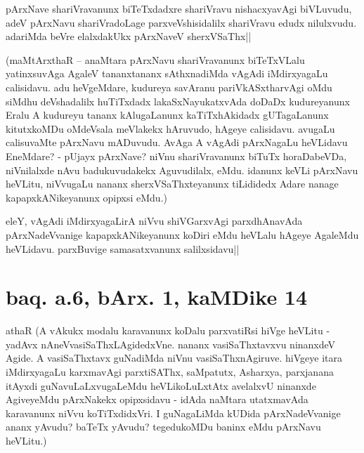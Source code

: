 \stext


\begin{artha}
pArxNave shariVravanunx biTeTxdadxre shariVravu nishacxyavAgi 
biVLuvudu, adeV pArxNavu shariVradoLage parxveVshisidalilx shariVravu 
edudx nilulxvudu. adariMda beVre elalxdakUkx pArxNaveV sherxVSaThx||
\end{artha}

(maMtArxthaR -- anaMtara pArxNavu shariVravanunx biTeTxVLalu 
yatinxsuvAga AgaleV tananxtananx sAthxnadiMda vAgAdi iMdirxyagaLu 
calisidavu. adu heVgeMdare, kudureya savAranu pariVkASxtharvAgi oMdu 
siMdhu deVshadalilx huTiTxdadx lakaSxNayukatxvAda doDaDx kudureyanunx 
Eralu A kudureyu tananx kAlugaLanunx kaTiTxhAkidadx gUTagaLanunx 
kitutxkoMDu oMdeVsala meVlakekx hAruvudo, hAgeye calisidavu. avugaLu 
calisuvaMte pArxNavu mADuvudu. AvAga A vAgAdi pArxNagaLu heVLidavu 
EneMdare? - pUjayx pArxNave? niVnu shariVravanunx biTuTx horaDabeVDa, 
niVnilalxde nAvu badukuvudakekx Aguvudilalx, eMdu. idanunx keVLi 
pArxNavu heVLitu, niVvugaLu nananx sherxVSaThxteyanunx tiLididedx 
Adare nanage kapapxkANikeyanunx opipxsi eMdu.)


\begin{artha}
eleY, vAgAdi iMdirxyagaLirA niVvu shiVGarxvAgi parxdhAnavAda 
pArxNadeVvanige kapapxkANikeyanunx koDiri eMdu heVLalu hAgeye AgaleMdu 
heVLidavu. parxBuvige samasatxvanunx salilxsidavu||
\end{artha}


\section*{baq. a.6, bArx. 1, kaMDike 14}

\stext

athaR (A vAkukx modalu karavanunx koDalu parxvatiRsi hiVge heVLitu - 
yadAvx nAneVvasiSaThxLAgidedxVne. nananx vasiSaThxtavxvu ninanxdeV 
Agide. A vasiSaThxtavx guNadiMda niVnu vasiSaThxnAgiruve. hiVgeye 
itara iMdirxyagaLu karxmavAgi parxtiSAThx, saMpatutx, Asharxya, 
parxjanana itAyxdi guNavuLaLxvugaLeMdu heVLikoLuLxtAtx avelalxvU 
ninanxde AgiveyeMdu pArxNakekx opipxsidavu - idAda naMtara utatxmavAda 
karavanunx niVvu koTiTxdidxVri. I guNagaLiMda kUDida pArxNadeVvanige 
ananx yAvudu? baTeTx yAvudu? tegedukoMDu baninx eMdu pArxNavu heVLitu.)

